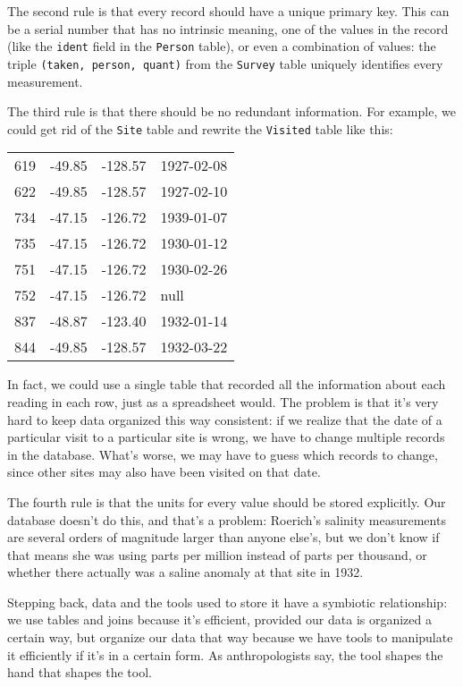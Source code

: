 \documentclass{book}
\begin{document}
The second rule is that every record should have a unique primary key.
This can be a serial number that has no intrinsic meaning, one of the
values in the record (like the \texttt{ident} field in the
\texttt{Person} table), or even a combination of values: the triple
\texttt{(taken, person, quant)} from the \texttt{Survey} table uniquely
identifies every measurement.

The third rule is that there should be no redundant information. For
example, we could get rid of the \texttt{Site} table and rewrite the
\texttt{Visited} table like this:

\begin{tabular}{llll}
619 & -49.85 & -128.57 & 1927-02-08 \\
622 & -49.85 & -128.57 & 1927-02-10 \\
734 & -47.15 & -126.72 & 1939-01-07 \\
735 & -47.15 & -126.72 & 1930-01-12 \\
751 & -47.15 & -126.72 & 1930-02-26 \\
752 & -47.15 & -126.72 & null \\
837 & -48.87 & -123.40 & 1932-01-14 \\
844 & -49.85 & -128.57 & 1932-03-22 \\
\end{tabular}

In fact, we could use a single table that recorded all the information
about each reading in each row, just as a spreadsheet would. The problem
is that it's very hard to keep data organized this way consistent: if we
realize that the date of a particular visit to a particular site is
wrong, we have to change multiple records in the database. What's worse,
we may have to guess which records to change, since other sites may also
have been visited on that date.

The fourth rule is that the units for every value should be stored
explicitly. Our database doesn't do this, and that's a problem:
Roerich's salinity measurements are several orders of magnitude larger
than anyone else's, but we don't know if that means she was using parts
per million instead of parts per thousand, or whether there actually was
a saline anomaly at that site in 1932.

Stepping back, data and the tools used to store it have a symbiotic
relationship: we use tables and joins because it's efficient, provided
our data is organized a certain way, but organize our data that way
because we have tools to manipulate it efficiently if it's in a certain
form. As anthropologists say, the tool shapes the hand that shapes the
tool.
\end{document}
